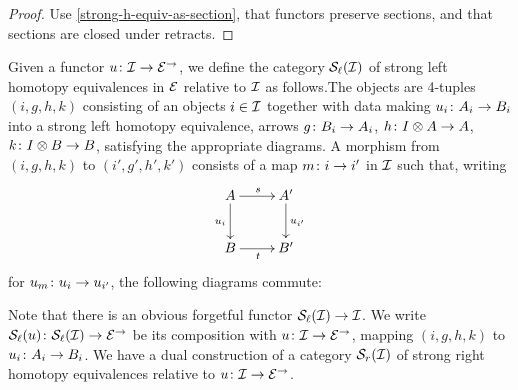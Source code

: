\documentclass[reqno,10pt,a4paper,oneside]{amsart}
\begin{document}
\begin{proof}
Use \cref{strong-h-equiv-as-section},  that functors preserve sections, and that  sections are closed under retracts.
\end{proof}





  


Given a functor $u \co \cal{I} \to \catE^{\to}$, we define the category $\cal{S}_\ell(\cal{I})$ of strong left homotopy equivalences in $\catE$ relative to $\cal{I}$ as follows.The objects are  4-tuples $(i, g,h,k)$ consisting of an objects $i \in \cal{I}$ together with data making $u_i \co A_i \to B_i$ into a strong left homotopy equivalence,
\ie arrows $g \co B_i \to A_i$, $h \co \interval \otimes A \to A$, $k \co \interval \otimes B \to B$, satisfying the appropriate diagrams.
A morphism from $(i,g, h, k)$ to $(i', g', h', k')$ consists of a map $m \co i \to i'$ in $\cal{I}$ such that, writing 
\[
\xymatrix{
A \ar[d]_{u_i}  \ar[r]^s & A' \ar[d]^{u_{i'}} \\
B \ar[r]_t & B'}
\]
for $u_m \co u_i \to u_{i'}$, the following diagrams commute:
Note that there is an obvious forgetful functor $\cal{S}_\ell(\cal{I}) \to \cal{I}$. We write $\cal{S}_\ell(u) \co \cal{S}_\ell(\cal{I}) \to \catE^{\to}$ be its composition with $u \co \cal{I} \to \catE^{\to}$, mapping $(i, g,h,k)$ to $u_i \co A_i \to B_i$. We have a dual construction of a category $\cal{S}_r(\cal{I})$ of strong right homotopy equivalences relative to  $u \co \cal{I} \to \catE^{\to}$.
\end{document}
